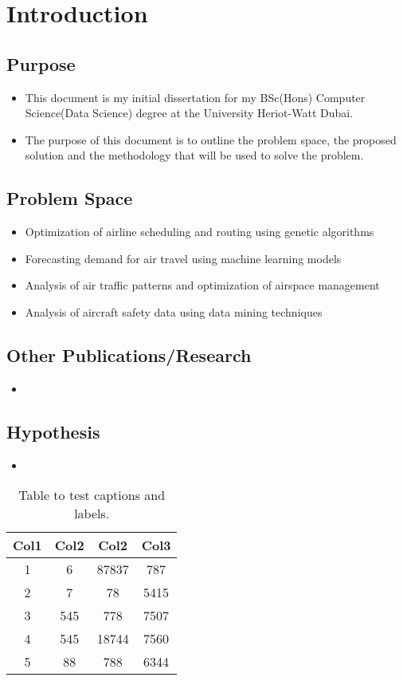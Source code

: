 \chapter{Introduction}

\section{Purpose}
\begin{itemize}
    \item This document is my initial dissertation for my BSc(Hons) Computer Science(Data Science) degree at the University Heriot-Watt Dubai.
    \item The purpose of this document is to outline the problem space, the proposed solution and the methodology that will be used to solve the problem.
\end{itemize}

\section{Problem Space}
\begin{itemize}
    \item Optimization of airline scheduling and routing using genetic algorithms
    \item Forecasting demand for air travel using machine learning models
    \item Analysis of air traffic patterns and optimization of airspace management
    \item Analysis of aircraft safety data using data mining techniques
\end{itemize}

\section{Other Publications/Research}
\begin{itemize}
    \item
\end{itemize}

\section{Hypothesis}
\begin{itemize}
    \item
\end{itemize}

\begin{table}[h!]
    \centering
    \begin{tabular}{||c c c c||} 
     \hline
     Col1 & Col2 & Col2 & Col3 \\ [0.5ex] 
     \hline\hline
     1 & 6 & 87837 & 787 \\ 
     2 & 7 & 78 & 5415 \\
     3 & 545 & 778 & 7507 \\
     4 & 545 & 18744 & 7560 \\
     5 & 88 & 788 & 6344 \\ [1ex] 
     \hline
    \end{tabular}
    \caption{Table to test captions and labels.}
    \label{table:1}
    \end{table}